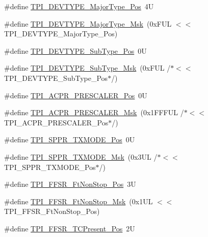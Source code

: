 \begin{DoxyCompactItemize}
\item 
\#define \mbox{\hyperlink{group___c_m_s_i_s___t_p_i_ga69c4892d332755a9f64c1680497cebdd}{T\+P\+I\+\_\+\+D\+E\+V\+T\+Y\+P\+E\+\_\+\+Major\+Type\+\_\+\+Pos}}~4U
\item 
\#define \mbox{\hyperlink{group___c_m_s_i_s___t_p_i_gaecbceed6d08ec586403b37ad47b38c88}{T\+P\+I\+\_\+\+D\+E\+V\+T\+Y\+P\+E\+\_\+\+Major\+Type\+\_\+\+Msk}}~(0x\+F\+U\+L $<$$<$ T\+P\+I\+\_\+\+D\+E\+V\+T\+Y\+P\+E\+\_\+\+Major\+Type\+\_\+\+Pos)
\item 
\#define \mbox{\hyperlink{group___c_m_s_i_s___t_p_i_ga0c799ff892af5eb3162d152abc00af7a}{T\+P\+I\+\_\+\+D\+E\+V\+T\+Y\+P\+E\+\_\+\+Sub\+Type\+\_\+\+Pos}}~0U
\item 
\#define \mbox{\hyperlink{group___c_m_s_i_s___t_p_i_ga5b2fd7dddaf5f64855d9c0696acd65c1}{T\+P\+I\+\_\+\+D\+E\+V\+T\+Y\+P\+E\+\_\+\+Sub\+Type\+\_\+\+Msk}}~(0x\+F\+U\+L /$\ast$$<$$<$ T\+P\+I\+\_\+\+D\+E\+V\+T\+Y\+P\+E\+\_\+\+Sub\+Type\+\_\+\+Pos$\ast$/)
\item 
\#define \mbox{\hyperlink{group___c_m_s_i_s___t_p_i_ga5a82d274eb2df8b0c92dd4ed63535928}{T\+P\+I\+\_\+\+A\+C\+P\+R\+\_\+\+P\+R\+E\+S\+C\+A\+L\+E\+R\+\_\+\+Pos}}~0U
\item 
\#define \mbox{\hyperlink{group___c_m_s_i_s___t_p_i_ga4fcacd27208419929921aec8457a8c13}{T\+P\+I\+\_\+\+A\+C\+P\+R\+\_\+\+P\+R\+E\+S\+C\+A\+L\+E\+R\+\_\+\+Msk}}~(0x1\+F\+F\+F\+U\+L /$\ast$$<$$<$ T\+P\+I\+\_\+\+A\+C\+P\+R\+\_\+\+P\+R\+E\+S\+C\+A\+L\+E\+R\+\_\+\+Pos$\ast$/)
\item 
\#define \mbox{\hyperlink{group___c_m_s_i_s___t_p_i_ga0f302797b94bb2da24052082ab630858}{T\+P\+I\+\_\+\+S\+P\+P\+R\+\_\+\+T\+X\+M\+O\+D\+E\+\_\+\+Pos}}~0U
\item 
\#define \mbox{\hyperlink{group___c_m_s_i_s___t_p_i_gaca085c8a954393d70dbd7240bb02cc1f}{T\+P\+I\+\_\+\+S\+P\+P\+R\+\_\+\+T\+X\+M\+O\+D\+E\+\_\+\+Msk}}~(0x3\+U\+L /$\ast$$<$$<$ T\+P\+I\+\_\+\+S\+P\+P\+R\+\_\+\+T\+X\+M\+O\+D\+E\+\_\+\+Pos$\ast$/)
\item 
\#define \mbox{\hyperlink{group___c_m_s_i_s___t_p_i_ga9537b8a660cc8803f57cbbee320b2fc8}{T\+P\+I\+\_\+\+F\+F\+S\+R\+\_\+\+Ft\+Non\+Stop\+\_\+\+Pos}}~3U
\item 
\#define \mbox{\hyperlink{group___c_m_s_i_s___t_p_i_gaaa313f980974a8cfc7dac68c4d805ab1}{T\+P\+I\+\_\+\+F\+F\+S\+R\+\_\+\+Ft\+Non\+Stop\+\_\+\+Msk}}~(0x1\+U\+L $<$$<$ T\+P\+I\+\_\+\+F\+F\+S\+R\+\_\+\+Ft\+Non\+Stop\+\_\+\+Pos)
\item 
\#define \mbox{\hyperlink{group___c_m_s_i_s___t_p_i_gad30fde0c058da2ffb2b0a213be7a1b5c}{T\+P\+I\+\_\+\+F\+F\+S\+R\+\_\+\+T\+C\+Present\+\_\+\+Pos}}~2U

\end{DoxyCompactItemize}
